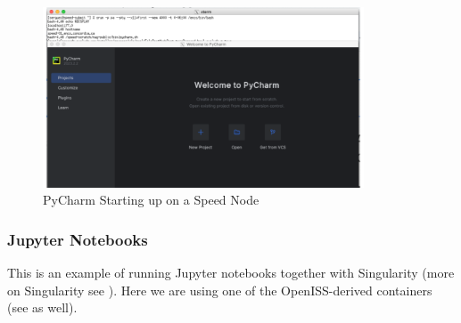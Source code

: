 \begin{figure}[h]
	\centering
		\includegraphics[width=0.85\textwidth]{images/pycharm}
	\caption{PyCharm Starting up on a Speed Node}
	\label{fig:pycharm}
\end{figure}

\subsubsection{Jupyter Notebooks}
\label{sect:jupyter}

This is an example of running Jupyter notebooks together with Singularity
(more on Singularity see ).
Here we are using one of the OpenISS-derived containers (see  as well).

